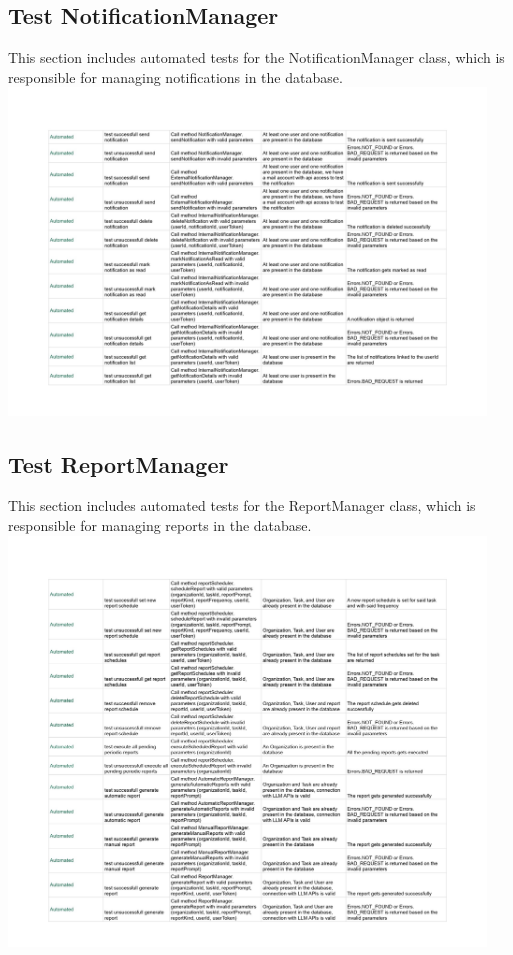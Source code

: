 \documentclass{article}
\begin{document}
\subsection*{Test NotificationManager}
This section includes automated tests for the NotificationManager class, which is responsible for managing notifications in the database.
\newline
\includegraphics[width=0.95\textwidth]{images/Test_NotificationManager.jpg}

\subsection*{Test ReportManager}
This section includes automated tests for the ReportManager class, which is responsible for managing reports in the database.
\newline
\includegraphics[width=0.95\textwidth]{images/Test_ReportManager.jpg}
\end{document}
